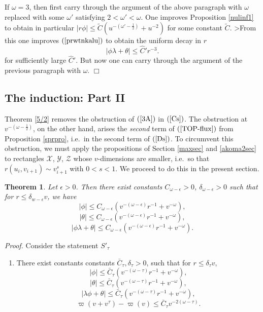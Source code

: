 \documentclass{article}
\newtheorem{theorem}{Theorem}[section]
\begin{document}
If $\omega=3$, then first carry through the argument
of the above paragraph with $\omega$ replaced with some $\omega'$ satisfying
$2<\omega'<\omega$. One improves Proposition \ref{nulinf1} to obtain in particular
$|r\phi|\le\tilde{C}\left(u^{-(\omega'-\frac12)}+u^{-2}\right)$ 
for some constant $\tilde{C}$. 
>From this one improves $(\ref{prwtnkalu})$ to obtain
the uniform decay in $r$
\begin{equation}
\label{deutkalu}
|\phi\lambda+\theta|\le \hat{C}'r^{-3}.
\end{equation}
for sufficiently large $\hat{C}'$. But now one can carry through the argument
of the previous paragraph with $\omega$. 
$\Box$

\subsection{The induction: Part II}
\label{finalsec}

Theorem \ref{5/2} removes the obstruction of $(\ref{3A})$
in $(\ref{Cs})$. The obstruction
at $v^{-\left(\omega-\frac12\right)}$, on the other hand, arises
the \emph{second} term of $(\ref{TOP-flux})$ from Proposition \ref{sprpro},
i.e.~in the second term of $(\ref{Ds})$. 
To circumvent this obstruction, we must apply the propositions
of Section \ref{maxsec} and \ref{akoma2sec} 
to rectangles $\mathcal{X}$, $\mathcal{Y}$, $\mathcal{Z}$ whose $v$-dimensions are smaller, 
i.e.~so that $r(u_i,v_{i+1})\sim v_{i+1}^s$
with $0<s<1$. We proceed to do this in the present section.


\begin{theorem}
\label{final1}
Let $\epsilon>0$.
Then there exist constants $C_{\omega-\epsilon}>0$, $\delta_{\omega-\epsilon}>0$ such that
for $r\le\delta_{w-\epsilon}v$, we have
\[
|\phi|\le C_{\omega-\epsilon}\left(v^{-(\omega-\epsilon)}r^{-1}+v^{-\omega}\right),
\]
\[
|\theta|\le C_{\omega-\epsilon}\left(v^{-(\omega-\epsilon)}r^{-1}+v^{-\omega}\right),
\]
\[
|\phi\lambda+\theta|\le C_{\omega-\epsilon}\left(v^{-(\omega-\epsilon)}r^{-1}+v^{-\omega}\right).
\]
\end{theorem}
 
\noindent\emph{Proof.}
Consider the statement  $S'_\tau$
\begin{enumerate}
\item[$(S'_\tau)$]
There exist constants
constants $\bar{C}_\tau, \delta_\tau>0$, such that
for $r\le\delta_\tau v$,
\begin{equation}
\label{22y''}
|\phi|\le \bar{C}_\tau\left(v^{-(\omega-\tau)}r^{-1}+v^{-\omega}\right),
\end{equation}
\begin{equation}
\label{33y''}
|\theta|\le \bar{C}_\tau\left(v^{-(\omega-\tau)}r^{-1}+v^{-\omega}\right),
\end{equation}
\[
|\lambda\phi+\theta|\le\bar{C}_\tau\left(v^{-(\omega-\tau)}r^{-1}+v^{-\omega}\right),
\]
\[
\varpi(v+v^\tau)-\varpi(v)
\le\bar{C}_\tau v^{-2(\omega-\tau)}.
\]
\end{enumerate}
\end{document}
